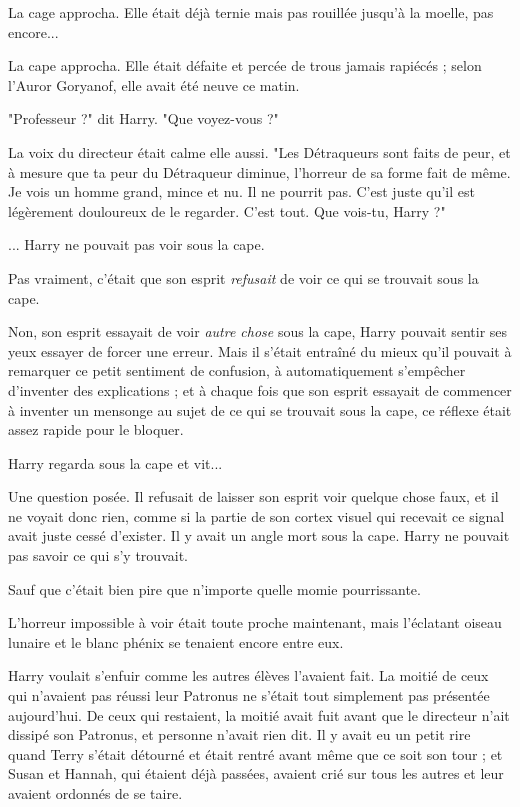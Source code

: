 La cage approcha. Elle était déjà ternie mais pas rouillée jusqu'à la moelle, pas encore...

La cape approcha. Elle était défaite et percée de trous jamais rapiécés ; selon l'Auror Goryanof, elle avait été neuve ce matin.

"Professeur ?" dit Harry. "Que voyez-vous ?"

La voix du directeur était calme elle aussi. "Les Détraqueurs sont faits de peur, et à mesure que ta peur du Détraqueur diminue, l'horreur de sa forme fait de même. Je vois un homme grand, mince et nu. Il ne pourrit pas. C'est juste qu'il est légèrement douloureux de le regarder. C'est tout. Que vois-tu, Harry ?"

... Harry ne pouvait pas voir sous la cape.

Pas vraiment, c'était que son esprit \emph{refusait}  de voir ce qui se trouvait sous la cape.

Non, son esprit essayait de voir \emph{autre chose}  sous la cape, Harry pouvait sentir ses yeux essayer de forcer une erreur. Mais il s'était entraîné du mieux qu'il pouvait à remarquer ce petit sentiment de confusion, à automatiquement s'empêcher d'inventer des explications ; et à chaque fois que son esprit essayait de commencer à inventer un mensonge au sujet de ce qui se trouvait sous la cape, ce réflexe était assez rapide pour le bloquer.

Harry regarda sous la cape et vit...

Une question posée. Il refusait de laisser son esprit voir quelque chose faux, et il ne voyait donc rien, comme si la partie de son cortex visuel qui recevait ce signal avait juste cessé d'exister. Il y avait un angle mort sous la cape. Harry ne pouvait pas savoir ce qui s'y trouvait.

Sauf que c'était bien pire que n'importe quelle momie pourrissante.

L'horreur impossible à voir était toute proche maintenant, mais l'éclatant oiseau lunaire et le blanc phénix se tenaient encore entre eux.

Harry voulait s'enfuir comme les autres élèves l'avaient fait. La moitié de ceux qui n'avaient pas réussi leur Patronus ne s'était tout simplement pas présentée aujourd'hui. De ceux qui restaient, la moitié avait fuit avant que le directeur n'ait dissipé son Patronus, et personne n'avait rien dit. Il y avait eu un petit rire quand Terry s'était détourné et était rentré avant même que ce soit son tour ; et Susan et Hannah, qui étaient déjà passées, avaient crié sur tous les autres et leur avaient ordonnés de se taire.

